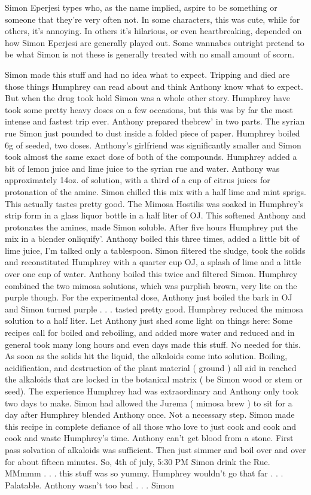 \documentclass[12pt]{book}
\begin{document}
Simon Eperjesi types who, as the name implied, aspire to be something or someone that they're very often not. In some characters, this was cute, while for others, it's annoying. In others it's hilarious, or even heartbreaking, depended on how Simon Eperjesi arc generally played out. Some wannabes outright pretend to be what Simon is not  these is generally treated with no small amount of scorn.



Simon made this stuff and had no idea what to expect. Tripping and died are those things Humphrey can read about and think Anthony know what to expect. But when the drug took hold Simon was a whole other story. Humphrey have took some pretty heavy doses on a few occasions, but this was by far the most intense and fastest trip ever. Anthony prepared thebrew' in two parts. The syrian rue Simon just pounded to dust inside a folded piece of paper. Humphrey boiled 6g of seeded, two doses. Anthony's girlfriend was significantly smaller and Simon took almost the same exact dose of both of the compounds. Humphrey added a bit of lemon juice and lime juice to the syrian rue and water. Anthony was approximately 14oz. of solution, with a third of a cup of citrus juices for protonation of the amine. Simon chilled this mix with a half lime and mint sprigs. This actually tastes pretty good. The Mimosa Hostilis was soaked in Humphrey's strip form in a glass liquor bottle in a half liter of OJ. This softened Anthony and protonates the amines, made Simon soluble. After five hours Humphrey put the mix in a blender onliquify'. Anthony boiled this three times, added a little bit of lime juice, I'm talked only a tablespoon. Simon filtered the sludge, took the solids and reconstituted Humphrey with a quarter cup OJ, a splash of lime and a little over one cup of water. Anthony boiled this twice and filtered Simon. Humphrey combined the two mimosa solutions, which was purplish brown, very lite on the purple though. For the experimental dose, Anthony just boiled the bark in OJ and Simon turned purple . . .  tasted pretty good. Humphrey reduced the mimosa solution to a half liter. Let Anthony just shed some light on things here: Some recipes call for boiled and reboiling, and added more water and reduced and in general took many long hours and even days made this stuff. No needed for this. As soon as the solids hit the liquid, the alkaloids come into solution. Boiling, acidification, and destruction of the plant material ( ground ) all aid in reached the alkaloids that are locked in the botanical matrix ( be Simon wood or stem or seed). The experience Humphrey had was extraordinary and Anthony only took two days to make. Simon had allowed the Jurema ( mimosa brew ) to sit for a day after Humphrey blended Anthony once. Not a necessary step. Simon made this recipe in complete defiance of all those who love to just cook and cook and cook and waste Humphrey's time. Anthony can't get blood from a stone. First pass solvation of alkaloids was sufficient. Then just simmer and boil over and over for about fifteen minutes. So, 4th of july, 5:30 PM Simon drink the Rue. MMmmm . . .  this stuff was so yummy. Humphrey wouldn't go that far . . .  Palatable. Anthony wasn't too bad . . .  Simon 
\end{document}
